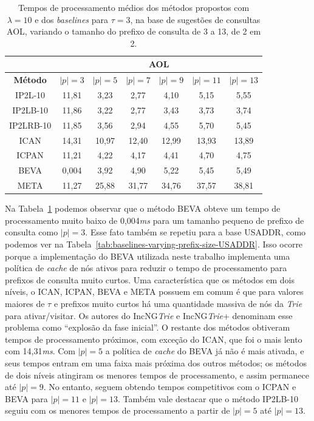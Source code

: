 \begin{table}[h]
\centering
\begin{tabular}{c|c|c|c|c|c|c|}
\cline{2-7}
\multicolumn{1}{l|}{} & \multicolumn{6}{c|}{\textbf{AOL}} \\ \hline
\multicolumn{1}{|c|}{\textbf{Método}} & $|p| =  3$ & $|p| =  5$ & $|p| =  7$ & $|p| =  9$ & $|p| =  11$ & $|p| =  13$ \\ \hline
\multicolumn{1}{|c|}{IP2L-10} & 11,81 & 3,23 & 2,77 & 4,10 & 5,15 & 5,55 \\ \hline
\multicolumn{1}{|c|}{IP2LB-10} & 11,86 & 3,22 & 2,77 & 3,43 & 3,73 & 3,74 \\ \hline
\multicolumn{1}{|c|}{IP2LRB-10} & 11,85 & 3,56 & 2,94 & 4,55 & 5,70 & 5,45 \\ \hline
\multicolumn{1}{|c|}{ICAN} & 14,31 & 10,97 & 12,40 & 12,99 & 13,93 & 13,89 \\ \hline
\multicolumn{1}{|c|}{ICPAN} & 11,21 & 4,22 & 4,17 & 4,41 & 4,70 & 4,75 \\ \hline
\multicolumn{1}{|c|}{BEVA} & 0,004 & 3,92 & 4,90 & 5,22 & 5,45 & 5,49 \\ \hline
\multicolumn{1}{|c|}{META} & 11,27 & 25,88 & 31,77 & 34,76 & 37,57 & 38,81 \\ \hline
\end{tabular}
\caption{Tempos de processamento médios dos métodos propostos com $\lambda=10$ e dos \textit{baselines} para $\tau=3$, na base de sugestões de consultas AOL, variando o tamanho do prefixo de consulta de 3 a 13, de 2 em 2.}
\label{tab:baselines-varying-prefix-size-AOL}
\end{table}

Na Tabela~\ref{tab:baselines-varying-prefix-size-AOL} podemos observar que o método BEVA obteve um tempo de processamento muito baixo de 0,004\textit{ms} para um tamanho pequeno de prefixo de consulta como $|p|=3$. Esse fato também se repetiu para a base USADDR, como podemos ver na Tabela~\ref{tab:baselines-varying-prefix-size-USADDR}. Isso ocorre porque a implementação do BEVA utilizada neste trabalho implementa uma política de \textit{cache} de nós ativos para reduzir o tempo de processamento para prefixos de consulta muito curtos. Uma característica que os métodos em dois níveis, o ICAN, ICPAN, BEVA e META possuem em comum é que para valores maiores de $\tau$ e prefixos muito curtos há uma quantidade massiva de nós da \textit{Trie} para ativar/visitar. Os autores do IncNG\textit{Trie} \citep{xiao2013efficient} e IncNG\textit{Trie}+ \citep{qin2020efficient} denominam esse problema como ``explosão da fase inicial''. O restante dos métodos obtiveram tempos de processamento próximos, com exceção do ICAN, que foi o mais lento com 14,31\textit{ms}. Com $|p|=5$ a política de \textit{cache} do BEVA já não é mais ativada, e seus tempos entram em uma faixa mais próxima dos outros métodos; os métodos de dois níveis atingiram os menores tempos de processamento, e assim permanece até $|p|=9$. No entanto, seguem obtendo tempos competitivos com o ICPAN e BEVA para $|p|=11$ e $|p|=13$. Também vale destacar que o método IP2LB-10 seguiu com os menores tempos de processamento a partir de $|p|=5$ até $|p|=13$.

